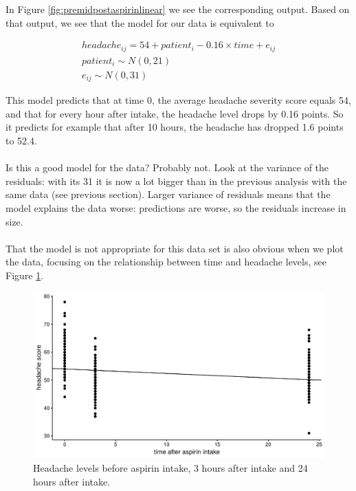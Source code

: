 \documentclass[]{book}\usepackage[]{graphicx}\usepackage[]{color}
\makeatletter
\def\maxwidth{ %
  \ifdim\Gin@nat@width>\linewidth
    \linewidth
  \else
    \Gin@nat@width
  \fi
}
\newenvironment{knitrout}{}{} %
\makeatother
\begin{document}
In Figure \ref{fig:premidpostaspirinlinear} we see the corresponding output. Based on that output, we see that the model for our data is equivalent to


\begin{eqnarray}
headache_{ij} = 54 + patient_i - 0.16 \times time + e_{ij} \\
patient_i \sim N(0, 21)\\
e_{ij} \sim N(0, 31)
\end{eqnarray}

This model predicts that at time 0, the average headache severity score equals 54, and that for every hour after intake, the headache level drops by 0.16 points. So it predicts for example that after 10 hours, the headache has dropped 1.6 points to 52.4. 
\\
\\
Is this a good model for the data? Probably not. Look at the variance of the residuals: with its 31 it is now a lot bigger than in the previous analysis with the same data (see previous section). Larger variance of residuals means that the model explains the data worse: predictions are worse, so the residuals increase in size. 
\\
\\
That the model is not appropriate for this data set is also obvious when we plot the data, focusing on the relationship between time and headache levels, see Figure \ref{fig:analysispremidpost5}. 


\begin{knitrout}
\color{fgcolor}\begin{figure}

{\centering \includegraphics[width=\maxwidth]{figure/analysispremidpost5-1} 

}

\caption[Headache levels before aspirin intake, 3 hours after intake and 24 hours after intake]{Headache levels before aspirin intake, 3 hours after intake and 24 hours after intake.}\label{fig:analysispremidpost5}
\end{figure}


\end{knitrout}
\end{document}
